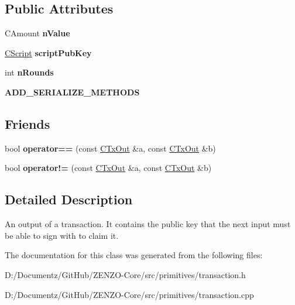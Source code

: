 \subsection*{Public Attributes}
\begin{DoxyCompactItemize}
\item 
\mbox{\label{class_c_tx_out_ab278ecef3817a972cb6bc5360d13f197}} 
C\+Amount {\bfseries n\+Value}
\item 
\mbox{\label{class_c_tx_out_a25bf3f2f4befb22a6a0be45784fe57e2}} 
\mbox{\hyperlink{class_c_script}{C\+Script}} {\bfseries script\+Pub\+Key}
\item 
\mbox{\label{class_c_tx_out_aeac97244e392de9dad0c0d0dd0184d1e}} 
int {\bfseries n\+Rounds}
\item 
\mbox{\label{class_c_tx_out_add758078b21ec1004fe8144fcee44890}} 
{\bfseries A\+D\+D\+\_\+\+S\+E\+R\+I\+A\+L\+I\+Z\+E\+\_\+\+M\+E\+T\+H\+O\+DS}
\end{DoxyCompactItemize}
\subsection*{Friends}
\begin{DoxyCompactItemize}
\item 
\mbox{\label{class_c_tx_out_a7ae3396bfd80108be89eaa97573eb1bb}} 
bool {\bfseries operator==} (const \mbox{\hyperlink{class_c_tx_out}{C\+Tx\+Out}} \&a, const \mbox{\hyperlink{class_c_tx_out}{C\+Tx\+Out}} \&b)
\item 
\mbox{\label{class_c_tx_out_a9657dc95dd3ba8b612baf7a5dd9b2e02}} 
bool {\bfseries operator!=} (const \mbox{\hyperlink{class_c_tx_out}{C\+Tx\+Out}} \&a, const \mbox{\hyperlink{class_c_tx_out}{C\+Tx\+Out}} \&b)
\end{DoxyCompactItemize}


\subsection{Detailed Description}
An output of a transaction. It contains the public key that the next input must be able to sign with to claim it. 

The documentation for this class was generated from the following files\+:\begin{DoxyCompactItemize}
\item 
D\+:/\+Documentz/\+Git\+Hub/\+Z\+E\+N\+Z\+O-\/\+Core/src/primitives/transaction.\+h\item 
D\+:/\+Documentz/\+Git\+Hub/\+Z\+E\+N\+Z\+O-\/\+Core/src/primitives/transaction.\+cpp\end{DoxyCompactItemize}
